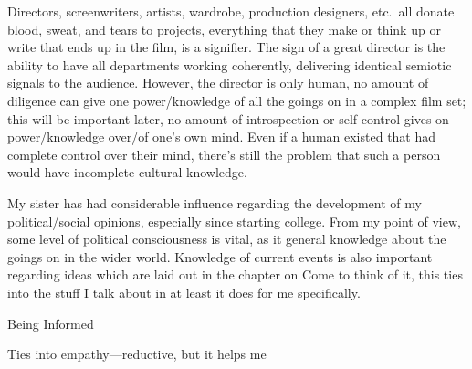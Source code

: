 \documentclass[../butidigress.tex]{subfiles}
\begin{document}
Directors, screenwriters, artists, wardrobe, production designers, etc.\ all donate blood, sweat, and tears to projects, everything that they make or think up or write that ends up in the film, is a signifier.
The sign of a great director is the ability to have all departments working coherently, delivering identical semiotic signals to the audience.
However, the director is only human, no amount of diligence can give one power/knowledge of all the goings on in a complex film set; this will be important later, no amount of introspection or self-control gives on power/knowledge over/of one's own mind.
Even if a human existed that had complete control over their mind, there's still the problem that such a person would have incomplete cultural knowledge.

My sister has had considerable influence regarding the development of my political/social opinions, especially since starting college.
From my point of view, some level of political consciousness is vital, as it general knowledge about the goings on in the wider world.
Knowledge of current events is also important regarding ideas which are laid out in the chapter on 
Come to think of it, this ties into the stuff I talk about in  at least it does for me specifically.

\begin{somenotes}{Being Informed}
    \item Ties into empathy---reductive, but it helps me 
\end{somenotes}
\end{document}

